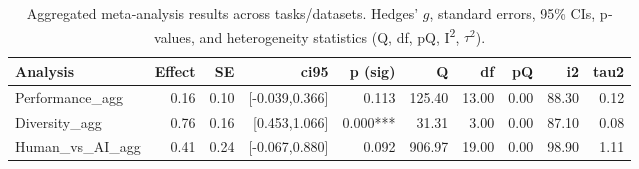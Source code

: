 \begin{table}[H]
\centering
\begin{tabular}{lrrrrrrrrr}
  \toprule
Analysis & Effect & SE & ci95 & p (sig) & Q & df & pQ & i2 & tau2 \\ 
  \midrule
Performance\_agg & 0.16 & 0.10 & [-0.039,0.366] & 0.113 & 125.40 & 13.00 & 0.00 & 88.30 & 0.12 \\ 
  Diversity\_agg & 0.76 & 0.16 & [0.453,1.066] & 0.000*** & 31.31 & 3.00 & 0.00 & 87.10 & 0.08 \\ 
  Human\_vs\_AI\_agg & 0.41 & 0.24 & [-0.067,0.880] & 0.092 & 906.97 & 19.00 & 0.00 & 98.90 & 1.11 \\ 
   \bottomrule
\end{tabular}
\caption{Aggregated meta‐analysis results across tasks/datasets. Hedges’ $g$, standard errors, 95\% CIs, p‐values, and heterogeneity statistics (Q, df, pQ, I\textsuperscript{2}, $\tau^2$).} 
\label{tab:meta_agg}
\end{table}
